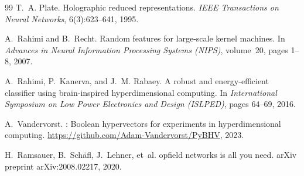 \documentclass[twoside,11pt]{article}
\begin{document}
\begin{thebibliography}{99}
T.~A. Plate.
\newblock Holographic reduced representations.
\newblock \textit{IEEE Transactions on Neural Networks}, 6(3):623--641, 1995.

A.~Rahimi and B.~Recht.
\newblock Random features for large-scale kernel machines.
\newblock In \textit{Advances in Neural Information Processing Systems (NIPS)}, volume~20, pages 1--8, 2007.

A.~Rahimi, P.~Kanerva, and J.~M. Rabaey.
\newblock A robust and energy-efficient classifier using brain-inspired hyperdimensional computing.
\newblock In \textit{International Symposium on Low Power Electronics and Design (ISLPED)}, pages 64--69, 2016.

A.~Vandervorst.
: Boolean hypervectors for experiments in hyperdimensional computing.
\newblock \url{https://github.com/Adam-Vandervorst/PyBHV}, 2023.

H.~Ramsauer, B.~Sch{\"a}fl, J.~Lehner, et~al.
opfield networks is all you need.
\newblock arXiv preprint arXiv:2008.02217, 2020.

\end{thebibliography}

\end{document}
